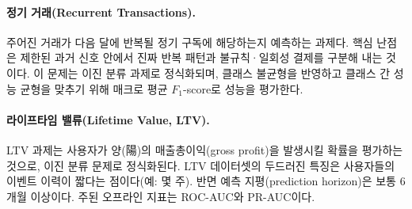 \paragraph*{정기 거래(Recurrent Transactions).}
주어진 거래가 다음 달에 반복될 정기 구독에 해당하는지 예측하는 과제다.
핵심 난점은 제한된 과거 신호 안에서 진짜 반복 패턴과 불규칙·일회성 결제를 구분해 내는 것이다.
이 문제는 이진 분류 과제로 정식화되며, 클래스 불균형을 반영하고 클래스 간 성능 균형을 맞추기 위해 매크로 평균 $F_\text{1}$-score로 성능을 평가한다.

\paragraph*{라이프타임 밸류(Lifetime Value, LTV).}
LTV 과제는 사용자가 양(陽)의 매출총이익(gross profit)을 발생시킬 확률을 평가하는 것으로, 이진 분류 문제로 정식화된다.
LTV 데이터셋의 두드러진 특징은 사용자들의 이벤트 이력이 짧다는 점이다(예: 몇 주). 반면 예측 지평(prediction horizon)은 보통 6개월 이상이다.
주된 오프라인 지표는 ROC-AUC와 PR-AUC이다.
